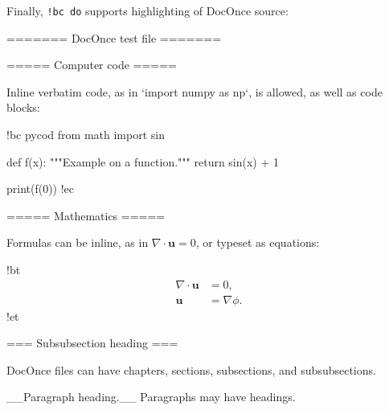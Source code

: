 \documentclass[%
oneside,                 %
final,                   %
10pt]{article}
\theoremstyle{definition}
\begin{document}
\erestructuredtext





















Finally, \Verb?!bc do? supports highlighting of DocOnce source:





































\bdo
======= DocOnce test file =======

===== Computer code =====

Inline verbatim code, as in `import numpy as np`, is allowed, as well as
code blocks:

!bc pycod
from math import sin

def f(x):
    """Example on a function."""
    return sin(x) + 1

print(f(0))
!ec


===== Mathematics =====

Formulas can be inline, as in $\nabla\cdot\bm{u} = 0$, or typeset
as equations:

!bt
\begin{align*}
\nabla\cdot\bm{u} &= 0,\\ 
\bm{u} &= \nabla\phi .
\end{align*}
!et

=== Subsubsection heading ===

DocOnce files can have chapters, sections, subsections, and subsubsections.

__Paragraph heading.__ Paragraphs may have headings.
\end{document}
